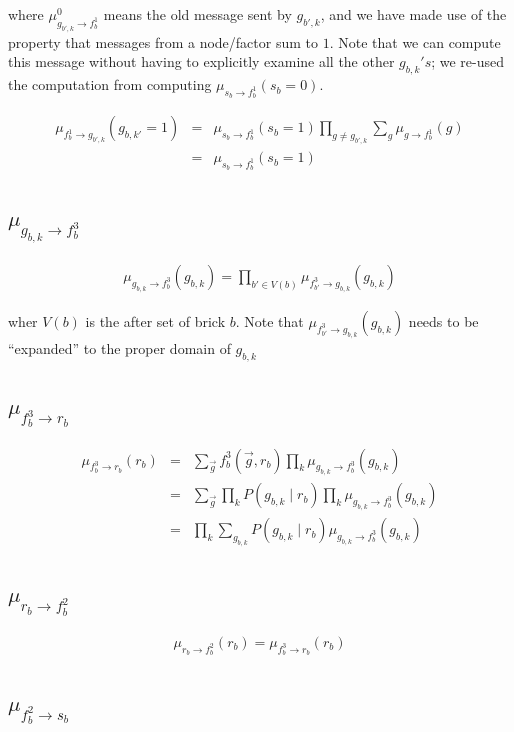 \documentclass[11pt]{article}
\newcommand{\fb}[1]{f_b^{#1}}
\newcommand{\mSbFb}[1]{\mu_{s_{b} \rightarrow \fb{#1}}}
\newcommand{\mFbSb}[1]{\mu_{ \fb{#1} \rightarrow s_{b}}}
\newcommand{\mFbRb}[1]{\mu_{ \fb{#1} \rightarrow r_{b}}}
\newcommand{\mRbFb}[1]{\mu_{ r_{b} \rightarrow  \fb{#1}}}
\newcommand{\mGbkFb}[1]{\mu_{  g_{b,k} \rightarrow \fb{#1}}}
\begin{document}
where  $\mu^0_{g_{b',k} \rightarrow \fb1}$ means the old message sent by $g_{b',k}$, and we have made use of the property that messages from a node/factor sum to $1$. Note that we can compute this message without having to explicitly examine all the other $g_{b,k}'s$; we re-used the computation from computing $\mSbFb1(s_b=0)$.

\begin{eqnarray}
\mu_{\fb1 \rightarrow g_{b',k}}(g_{b,k'}=1) &=& \mSbFb1(s_b=1) \prod_{g \neq g_{b',k}} \sum_{g}  \mu_{g \rightarrow \fb1}(g) \\
&=&  \mSbFb1(s_b=1) 
\end{eqnarray}

\subsection{$\mGbkFb3$}

\begin{eqnarray}
\mGbkFb3(g_{b,k}) = \prod_{b' \in V(b)} \mu_{f_{b'}^3 \rightarrow g_{b,k}}(g_{b,k})
\end{eqnarray}

wher $V(b)$ is the after set of brick $b$. Note that $ \mu_{f_{b'}^3 \rightarrow g_{b,k}}(g_{b,k})$ needs to be ``expanded'' to the proper domain of $g_{b,k}$

\subsection{$\mFbRb3$}

\begin{eqnarray}
\mFbRb3(r_{b}) &=& \sum_{\vec{g}} \fb3(\vec{g},r_b) \prod_{k} \mGbkFb3(g_{b,k}) \\
&=& \sum_{\vec{g}}\prod_{k} P(g_{b,k} \mid r_b) \prod_{k} \mGbkFb3(g_{b,k}) \\
&=&\prod_{k} \sum_{g_{b,k}} P(g_{b,k} \mid r_b) \mGbkFb3(g_{b,k})
\end{eqnarray}

\subsection{$\mRbFb2$}

\begin{eqnarray}
\mRbFb2(r_b) = \mFbRb3(r_b)
\end{eqnarray}

\subsection{$\mFbSb2$}
\end{document}
